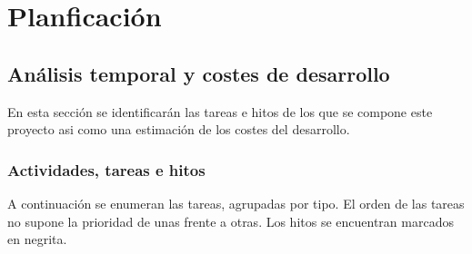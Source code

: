 \chapter{Planficación}\label{cap_planificacion}
\section{Análisis temporal y costes de desarrollo}
En esta sección se identificarán las tareas e hitos de los que se compone este proyecto asi como una estimación de los costes del desarrollo.

\subsection{Actividades, tareas e hitos}
A continuación se enumeran las tareas, agrupadas por tipo. El orden de las tareas no supone la prioridad de unas frente a otras. Los hitos se encuentran marcados en negrita.

